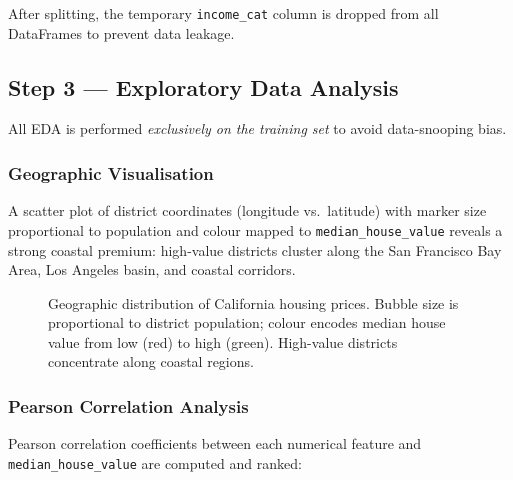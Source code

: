 \documentclass[conference]{IEEEtran}
\begin{document}
After splitting, the temporary \texttt{income\_cat} column is dropped from all DataFrames to prevent data leakage.

\subsection{Step 3 — Exploratory Data Analysis}
\label{sec:eda}

All EDA is performed \emph{exclusively on the training set} to avoid data-snooping bias.

\subsubsection{Geographic Visualisation}

A scatter plot of district coordinates (longitude vs.\ latitude) with marker size proportional to population and colour mapped to \texttt{median\_house\_value} reveals a strong coastal premium: high-value districts cluster along the San Francisco Bay Area, Los Angeles basin, and coastal corridors.

\begin{figure}[H]
    \centering
    \caption{Geographic distribution of California housing prices. Bubble size is proportional to district population; colour encodes median house value from low (red) to high (green). High-value districts concentrate along coastal regions.}
    \label{fig:geomap}
\end{figure}

\subsubsection{Pearson Correlation Analysis}

Pearson correlation coefficients between each numerical feature and \texttt{median\_house\_value} are computed and ranked:
\end{document}
